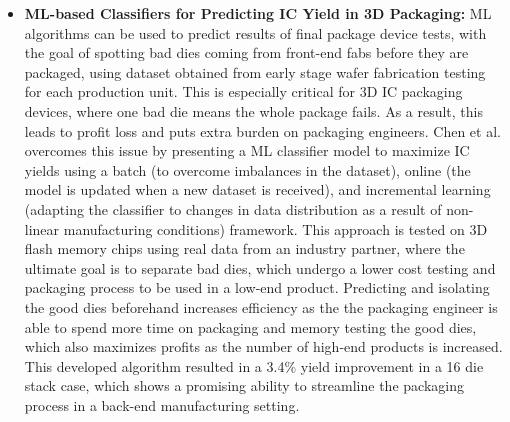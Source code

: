 \begin{itemize}
        \item \textbf{ML-based Classifiers for Predicting IC Yield in 3D Packaging:} ML algorithms can be used to predict results of final package device tests, with the goal of spotting bad dies coming from front-end fabs before they are packaged, using dataset obtained from early stage wafer fabrication testing for each production unit. This is especially critical for 3D IC packaging devices, where one bad die means the whole package fails. As a result, this leads to profit loss and puts extra burden on packaging engineers. Chen et al. \cite{Chen2017-xb} overcomes this issue by presenting a ML classifier model to maximize IC yields using a batch (to overcome imbalances in the dataset), online (the model is updated when a new dataset is received), and incremental learning (adapting the classifier to changes in data distribution as a result of non-linear manufacturing conditions) framework. This approach is tested on 3D flash memory chips using real data from an industry partner, where the ultimate goal is to separate bad dies, which undergo a lower cost testing and packaging process to be used in a low-end product. Predicting and isolating the good dies beforehand increases efficiency as the the packaging engineer is able to spend more time on packaging and memory testing the good dies, which also maximizes profits as the number of high-end products is increased. This developed algorithm resulted in a 3.4\% yield improvement in a 16 die stack case, which shows a promising ability to streamline the packaging process in a back-end manufacturing setting.

    
    \end{itemize}



